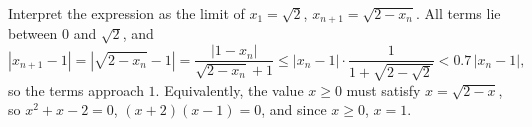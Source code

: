 Interpret the expression as the limit of $x_1=\sqrt2$, $x_{n+1}=\sqrt{2-x_n}$. All terms lie between $0$ and $\sqrt2$, and
\[
|x_{n+1}-1|=\left|\sqrt{2-x_n}-1\right|=\dfrac{|1-x_n|}{\sqrt{2-x_n}+1}\le|x_n-1| \cdot\dfrac{1}{1+\sqrt{2-\sqrt2}}<0.7\,|x_n-1| ,
\]
so the terms approach $1$. Equivalently, the value $x\ge0$ must satisfy $x=\sqrt{2-x}$, so $x^2+x-2=0$, $(x+2)(x-1)=0$, and since $x\ge0$, $x=\boxed{1}$.
